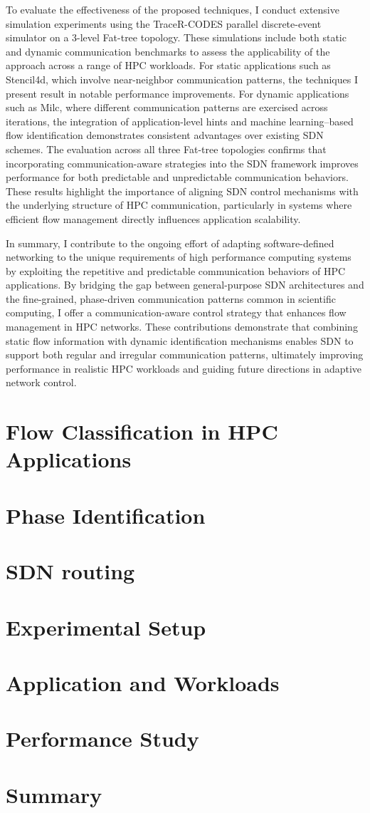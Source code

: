 To evaluate the effectiveness of the proposed techniques, I conduct extensive simulation experiments using the TraceR-CODES parallel discrete-event simulator on a 3-level Fat-tree topology. These simulations include both static and dynamic communication benchmarks to assess the applicability of the approach across a range of HPC workloads. For static applications such as Stencil4d, which involve near-neighbor communication patterns, the techniques I present result in notable performance improvements. For dynamic applications such as Milc, where different communication patterns are exercised across iterations, the integration of application-level hints and machine learning--based flow identification demonstrates consistent advantages over existing SDN schemes. The evaluation across all three Fat-tree topologies confirms that incorporating communication-aware strategies into the SDN framework improves performance for both predictable and unpredictable communication behaviors. These results highlight the importance of aligning SDN control mechanisms with the underlying structure of HPC communication, particularly in systems where efficient flow management directly influences application scalability.

In summary, I contribute to the ongoing effort of adapting software-defined networking to the unique requirements of high performance computing systems by exploiting the repetitive and predictable communication behaviors of HPC applications. By bridging the gap between general-purpose SDN architectures and the fine-grained, phase-driven communication patterns common in scientific computing, I offer a communication-aware control strategy that enhances flow management in HPC networks. These contributions demonstrate that combining static flow information with dynamic identification mechanisms enables SDN to support both regular and irregular communication patterns, ultimately improving performance in realistic HPC workloads and guiding future directions in adaptive network control.


\section{Flow Classification in HPC Applications}

\section{Phase Identification}

\section{SDN routing}

\section{Experimental Setup}

\section{Application and Workloads}

\section{Performance Study}

\section{Summary}

